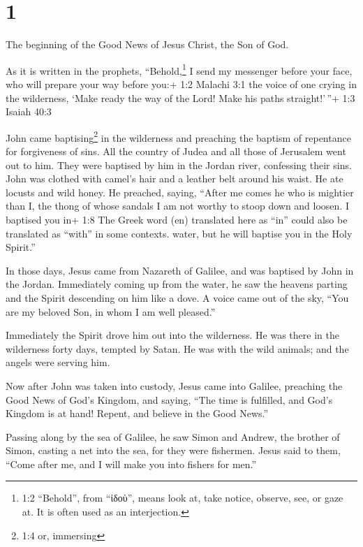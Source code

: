 \hypertarget{section}{%
\section{1}\label{section}}

 The beginning of the Good News of Jesus Christ, the Son of
God.

 As it is written in the prophets, ``Behold,\footnote{1:2
  ``Behold'', from ``ἰδοὺ'', means look at, take notice, observe, see,
  or gaze at. It is often used as an interjection.} I send my messenger
before your face, who will prepare your way before you:+ 1:2 Malachi 3:1
 the voice of one crying in the wilderness, `Make ready the
way of the Lord! Make his paths straight!'\,''+ 1:3 Isaiah 40:3

 John came baptising\footnote{1:4 or, immersing} in the
wilderness and preaching the baptism of repentance for forgiveness of
sins.  All the country of Judea and all those of Jerusalem
went out to him. They were baptised by him in the Jordan river,
confessing their sins.  John was clothed with camel's hair
and a leather belt around his waist. He ate locusts and wild honey.
 He preached, saying, ``After me comes he who is mightier
than I, the thong of whose sandals I am not worthy to stoop down and
loosen.  I baptised you in+ 1:8 The Greek word (en)
translated here as ``in'' could also be translated as ``with'' in some
contexts. water, but he will baptise you in the Holy Spirit.''

 In those days, Jesus came from Nazareth of Galilee, and was
baptised by John in the Jordan.  Immediately coming up from
the water, he saw the heavens parting and the Spirit descending on him
like a dove.  A voice came out of the sky, ``You are my
beloved Son, in whom I am well pleased.''

 Immediately the Spirit drove him out into the wilderness.
 He was there in the wilderness forty days, tempted by
Satan. He was with the wild animals; and the angels were serving him.

 Now after John was taken into custody, Jesus came into
Galilee, preaching the Good News of God's Kingdom,  and
saying, ``The time is fulfilled, and God's Kingdom is at hand! Repent,
and believe in the Good News.''

 Passing along by the sea of Galilee, he saw Simon and
Andrew, the brother of Simon, casting a net into the sea, for they were
fishermen.  Jesus said to them, ``Come after me, and I will
make you into fishers for men.''

